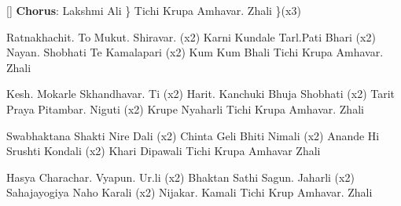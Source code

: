 []
    \beginchorus{}
        {\bf Chorus}:
        Lakshmi Ali \}
        Tichi Krupa Amhavar. Zhali \}(x3)
    \endchorus{}

    \beginverse{}
        Ratnakhachit. To Mukut. Shiravar. (x2)
        Karni Kundale Tarl.Pati Bhari (x2)
        Nayan. Shobhati Te Kamalapari (x2)
        Kum Kum Bhali Tichi Krupa Amhavar. Zhali
    \endverse{}


    \beginverse{}
        Kesh. Mokarle Skhandhavar. Ti (x2)
        Harit. Kanchuki Bhuja Shobhati (x2)
        Tarit Praya Pitambar. Niguti (x2)
        Krupe Nyaharli Tichi Krupa Amhavar. Zhali
    \endverse{}

    \beginverse{}
        Swabhaktana Shakti Nire Dali (x2)
        Chinta Geli Bhiti Nimali (x2)
        Anande Hi Srushti Kondali (x2)
        Khari Dipawali Tichi Krupa Amhavar Zhali
    \endverse{}



    \beginverse{}
        Hasya Charachar. Vyapun. Ur.li (x2)
        Bhaktan Sathi Sagun. Jaharli (x2)
        Sahajayogiya Naho Karali (x2)
        Nijakar. Kamali Tichi Krup Amhavar. Zhali
    \endverse{}

\endsong{}
